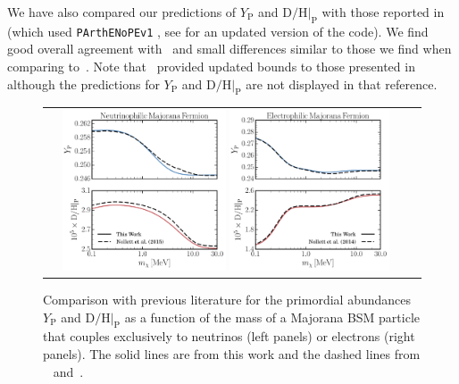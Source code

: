 \documentclass[notitlepage,letterpaper,natbib,aps,prd,onecolumn,amsmath,amsfonts,nofootinbib,preprintnumbers,superscriptaddress,secnumarabic,groupedaddress]{revtex4-1}
\begin{document}
We have also compared our predictions of $Y_{\mathrm{P}}$ and $\mathrm{D}/\mathrm{H}|_{\mathrm{P}}$ with those reported in~\cite{Boehm:2013jpa} (which used  \texttt{PArthENoPEv1} \cite{Pisanti:2007hk}, see \cite{Consiglio:2017pot} for an updated version of the code). We find good overall agreement with~\cite{Boehm:2013jpa} and small differences similar to those we find when comparing to~\cite{Nollett:2013pwa,Nollett:2014lwa}. Note that~\cite{Wilkinson:2016gsy} provided updated bounds to those presented in~\cite{Boehm:2013jpa} although the predictions for $Y_{\mathrm{P}}$ and $\mathrm{D}/\mathrm{H}|_{\mathrm{P}}$ are not displayed in that reference.

\begin{figure}[t]
    \begin{center}
    \begin{tabular}{cc}
     \hspace{-0.5cm} \includegraphics[width=0.46\textwidth]{figures/NollettNU.pdf}  \hspace{0.4cm} \includegraphics[width=0.45\textwidth]{figures/NollettEE.pdf}
      \end{tabular}
      \end{center}\vspace{-0.8cm}
    \caption{Comparison with previous literature for the primordial abundances $Y_{\mathrm{P}}$ and $\mathrm{D}/\mathrm{H}|_{\mathrm{P}}$ as a function of the mass of a Majorana BSM particle that couples exclusively to neutrinos (left panels) or electrons (right panels). The solid lines are from this work and the dashed lines from ~\cite{Nollett:2013pwa} and~\cite{Nollett:2014lwa}.}
    \label{fig:mccabe}
\end{figure}
\end{document}
